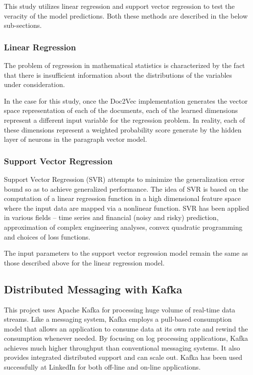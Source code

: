 \documentclass[conference]{IEEEtran}
\begin{document}
        This study utilizes linear regression and support vector regression to test the veracity of the model predictions.
        Both these methods are described in the below sub-sections.

        \subsubsection{Linear Regression}
            The problem of regression in mathematical statistics is characterized by the fact that there is insufficient information about the distributions of the variables under consideration\cite{regression_analysis}.

            In the case for this study, once the Doc2Vec implementation generates the vector space representation of each of the documents, each of the learned dimensions represent a different input variable for the regression problem. In reality, each of these dimensions represent a weighted probability score generate by the hidden layer of neurons in the paragraph vector model.

        \subsubsection{Support Vector Regression}
            Support Vector Regression (SVR) attempts to minimize the generalization error bound so as to achieve generalized performance. The idea of SVR is based on the computation of a linear regression function in a high dimensional feature space where the input data are mapped via a nonlinear function. SVR has been applied in various fields – time series and financial (noisy and risky) prediction, approximation of complex engineering analyses, convex quadratic programming and choices of loss functions\cite{basak2007support}.

            The input parameters to the support vector regression model remain the same as those described above for the linear regression model.

    \subsection{Distributed Messaging with Kafka}
        This project uses Apache Kafka for processing huge volume of real-time data streams.
        Like a messaging system, Kafka employs a pull-based consumption model that allows an application to consume data at its own rate and rewind the consumption whenever needed. 
        By focusing on log processing applications, Kafka achieves much higher throughput than conventional messaging systems. 
        It also provides integrated distributed support and can scale out. 
        Kafka has been used successfully at LinkedIn for both off-line and on-line applications. \cite{kreps2011kafka}
\end{document}
